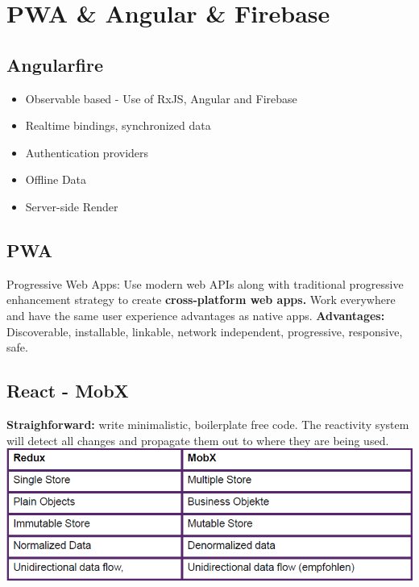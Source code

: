 
\section{PWA \& Angular \& Firebase}
\subsection{Angularfire}
\begin{itemize}
    \item Observable based - Use of RxJS, Angular and Firebase
    \item Realtime bindings, synchronized data
    \item Authentication providers
    \item Offline Data
    \item Server-side Render
\end{itemize}

\subsection{PWA}
Progressive Web Apps: Use modern web APIs along with traditional progressive enhancement strategy to create \textbf{cross-platform web apps.}
Work everywhere and have the same user experience advantages as native apps. \textbf{Advantages:} Discoverable, installable, linkable, network independent, progressive, responsive, safe.

\subsection{React - MobX}
\textbf{Straighforward:} write minimalistic, boilerplate free code.
The reactivity system will detect all changes and propagate them out to where they are being used.\\
\includegraphics[width=0.6\linewidth]{img/pwa_mobx.png}